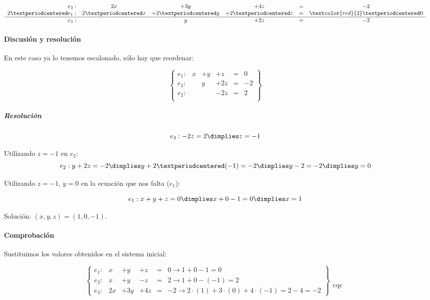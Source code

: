 \documentclass[palatino,nosec]{Docencia}
\begin{document}
\begin{problem}
\[
\begin{array}{rccccc}
e_3: &2x&+3y&+4z&=&-2\\
2·e_1: &2·x&+2·y&+2·z&=&\textcolor{red}{2}·0\\
\hline
e_3: &&y&+2z&=&-2\\
\end{array}
\]	


\paragraph{Discusión y resolución}

En este caso ya lo tenemos escalonado, sólo hay que reordenar:

\[
\left\{\begin{array}{lccccc}
e_1: &x&+y&+z&=&0\\
e_3: &&y&+2z&=&-2\\
e_2: &&&-2z&=&2\\
\end{array}\right\}
\]

\subparagraph{Resolución}

\[e_3: -2z=2 \dimplies z=-1\]


Utilizando $z=-1$ en $e_2$:
\[e_2: y+2z=-2 \dimplies y+2·(-1) = -2 \dimplies y-2=-2 \dimplies y=0\]

Utilizando $z=-1$, $y=0$ en la ecuación que nos falta ($e_1$):

\[
e_1: x+y+z=0 \dimplies x+0-1=0 \dimplies x=1
\]


Solución: $(x,y,z) = (1,0,-1)$.

\paragraph{Comprobación}

Sustituimos los valores obtenidos en el sistema inicial:

\[
\left\{\begin{array}{lccccl}
e_1: &x&+y&+z&=&0 \to 1+0-1=0\\
e_2: &x&+y&-z&=&2 \to 1+0-(-1) = 2 \\
e_3: &2x&+3y&+4z&=&-2 \to 2·(1) + 3·(0) + 4·(-1) = 2-4=-2 
\end{array}\right\}\begin{array}{c}\\\\\\\\\text{cqc}\end{array}
\]

\end{problem}
\end{document}
